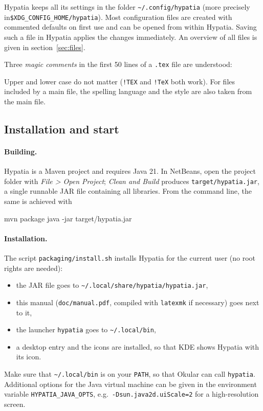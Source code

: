 \documentclass[11pt]{article}
\newcommand{\menu}[1]{\textsf{\textit{#1}}}
\newcommand{\file}[1]{\texttt{#1}}
\newcommand{\cfgdir}{\texttt{\textasciitilde/.config/hypatia}}
\begin{document}
    Hypatia keeps all its settings in the folder \cfgdir{} (more precisely in\linebreak \verb+$XDG_CONFIG_HOME/hypatia+). Most configuration files are created with commented defaults on first use and can be opened from within Hypatia. Saving such a file in Hypatia applies the changes immediately. An overview of all files is given in section~\ref{sec:files}.

    Three \emph{magic comments} in the first 50 lines of a \file{.tex} file are understood:
    \begin{Code}
    \end{Code}
    Upper and lower case do not matter (\verb+!TEX+ and \verb+!TeX+ both work). For files included by a main file, the spelling language and the style are also taken from the main file.

    \subsection{Installation and start}

    \paragraph{Building.} Hypatia is a Maven project and requires Java 21. In NetBeans, open the project folder with \menu{File > Open Project}; \menu{Clean and Build} produces \file{target/hypatia.jar}, a single runnable JAR file containing all libraries. From the command line, the same is achieved with
    \begin{Code}
mvn package
java -jar target/hypatia.jar
    \end{Code}

    \paragraph{Installation.} The script \file{packaging/install.sh} installs Hypatia for the current user (no root rights are needed):
    \begin{itemize}
        \itemsep-1mm
        \item the JAR file goes to \file{\textasciitilde/.local/share/hypatia/hypatia.jar},
        \item this manual (\file{doc/manual.pdf}, compiled with \verb+latexmk+ if necessary) goes next to it,
        \item the launcher \verb+hypatia+ goes to \file{\textasciitilde/.local/bin},
        \item a desktop entry and the icons are installed, so that KDE shows Hypatia with its icon.
    \end{itemize}
    Make sure that \file{\textasciitilde/.local/bin} is on your \verb+PATH+, so that Okular can call \verb+hypatia+. Additional options for the Java virtual machine can be given in the environment variable \verb+HYPATIA_JAVA_OPTS+, e.g.\ \verb+-Dsun.java2d.uiScale=2+ for a high-resolution screen.
\end{document}
